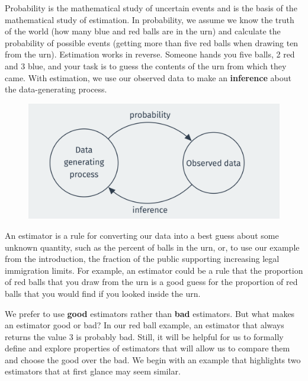 \documentclass[
  letterpaper,
  DIV=11,
  numbers=noendperiod]{scrreprt}
\theoremstyle{plain}
\theoremstyle{definition}
\theoremstyle{definition}
\theoremstyle{remark}
\begin{document}
Probability is the mathematical study of uncertain events and is the
basis of the mathematical study of estimation. In probability, we assume
we know the truth of the world (how many blue and red balls are in the
urn) and calculate the probability of possible events (getting more than
five red balls when drawing ten from the urn). Estimation works in
reverse. Someone hands you five balls, 2 red and 3 blue, and your task
is to guess the contents of the urn from which they came. With
estimation, we use our observed data to make an \textbf{inference} about
the data-generating process.

\begin{figure}[th]

{\centering \includegraphics{assets/img/two-direction.png}

}

\end{figure}

An estimator is a rule for converting our data into a best guess about
some unknown quantity, such as the percent of balls in the urn, or, to
use our example from the introduction, the fraction of the public
supporting increasing legal immigration limits. For example, an
estimator could be a rule that the proportion of red balls that you draw
from the urn is a good guess for the proportion of red balls that you
would find if you looked inside the urn.

We prefer to use \textbf{good} estimators rather than \textbf{bad}
estimators. But what makes an estimator good or bad? In our red ball
example, an estimator that always returns the value 3 is probably bad.
Still, it will be helpful for us to formally define and explore
properties of estimators that will allow us to compare them and choose
the good over the bad. We begin with an example that highlights two
estimators that at first glance may seem similar.
\end{document}
